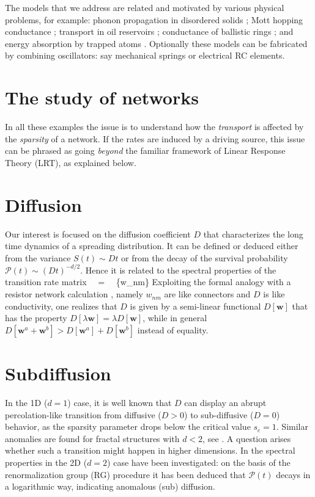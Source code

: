 
The models that we address are related and motivated  
by various physical problems, for example: 
phonon propagation in disordered solids \cite{phn1,phn2,amir}; 
Mott hopping conductance \cite{mott,miller,AHL,Halp,pollak,VRHbook};
transport in oil reservoirs \cite{aa1,aa2};
conductance of ballistic rings \cite{kbd};
and energy absorption by trapped atoms \cite{kbw}. 
%
Optionally these models can be fabricated by combining oscillators: 
say mechanical springs or electrical RC elements. 

\section{The study of networks}
%   
In all these examples the issue is to understand how 
the {\em transport} is affected by the {\em sparsity} of a network.  
If the rates are induced by a driving source, this issue can be phrased as  
going {\em beyond} the familiar framework of Linear Response Theory (LRT), 
as explained below.  

\section{Diffusion} 
Our interest is focused on the diffusion coefficient $D$ that characterizes the 
long time dynamics of a spreading distribution. It can be defined or deduced 
either from the variance ${S(t) \sim Dt}$ or from the decay of the 
survival probability ${\mathcal{P}(t) \sim (D t)^{-d/2}}$. Hence it is 
related to the spectral properties of the transition rate matrix 
%
\beq
{} \ \ = \ \ \{w_{nm}\}
\eeq
%
Exploiting the formal analogy with a resistor network calculation \cite{miller},  
namely $w_{nm}$ are like connectors and $D$ is like conductivity, 
one realizes that $D$ is given by a semi-linear functional $D[\bm{w}]$ 
that has the property ${D[\lambda \bm{w}] = \lambda D[\bm{w}]}$, 
while in general ${D[\bm{w}^a+\bm{w}^b] > D[\bm{w}^a]+D[\bm{w}^b]}$ instead of equality.      


\section{Subdiffusion}
In the 1D ($d{=}1$) case, it is well known \cite{alexander} that $D$ can display an abrupt 
percolation-like transition from diffusive (${D>0}$) to sub-diffusive (${D=0}$) 
behavior, as the sparsity parameter drops below the critical value ${s_c=1}$.
Similar anomalies are found for fractal structures with ${d<2}$, see \cite{granek,havlin}. 
A question arises whether such a transition might happen in higher dimensions.  
In \cite{amir} the spectral properties in the 2D ($d{=}2$) case 
have been investigated: on the basis of the renormalization group (RG) procedure 
it has been deduced that $\mathcal{P}(t)$ decays in a logarithmic way, 
indicating anomalous (sub) diffusion.  


